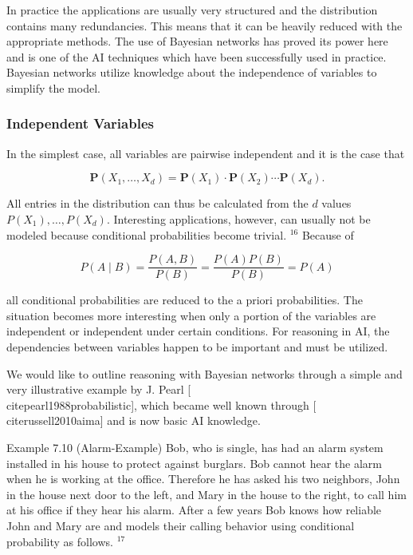 \documentclass[10pt]{book}
\begin{document}
In practice the applications are usually very structured and the distribution contains many redundancies. This means that it can be heavily reduced with the appropriate methods. The use of Bayesian networks has proved its power here and is one of the AI techniques which have been successfully used in practice. Bayesian networks utilize knowledge about the independence of variables to simplify the model.

\subsubsection*{Independent Variables}
In the simplest case, all variables are pairwise independent and it is the case that

$$
\boldsymbol{P}\left(X_{1}, \ldots, X_{d}\right)=\boldsymbol{P}\left(X_{1}\right) \cdot \boldsymbol{P}\left(X_{2}\right) \cdots \boldsymbol{P}\left(X_{d}\right) .
$$

All entries in the distribution can thus be calculated from the $d$ values $P\left(X_{1}\right), \ldots, P\left(X_{d}\right)$. Interesting applications, however, can usually not be modeled because conditional probabilities become trivial. ${ }^{16}$ Because of


$$
P(A \mid B)=\frac{P(A, B)}{P(B)}=\frac{P(A) P(B)}{P(B)}=P(A)
$$

all conditional probabilities are reduced to the a priori probabilities. The situation becomes more interesting when only a portion of the variables are independent or independent under certain conditions. For reasoning in AI, the dependencies between variables happen to be important and must be utilized.

We would like to outline reasoning with Bayesian networks through a simple and very illustrative example by J. Pearl [\\cite{pearl1988probabilistic}], which became well known through [\\cite{russell2010aima}] and is now basic AI knowledge.

Example 7.10 (Alarm-Example) Bob, who is single, has had an alarm system installed in his house to protect against burglars. Bob cannot hear the alarm when he is working at the office. Therefore he has asked his two neighbors, John in the house next door to the left, and Mary in the house to the right, to call him at his office if they hear his alarm. After a few years Bob knows how reliable John and Mary are and models their calling behavior using conditional probability as follows. ${ }^{17}$
\end{document}
